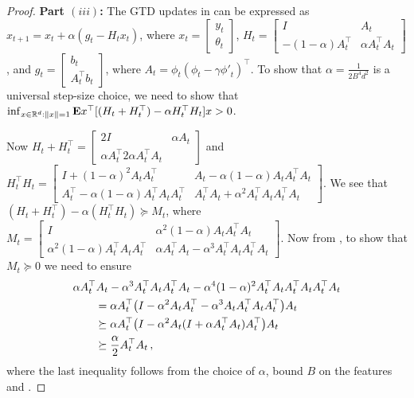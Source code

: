 \begin{proof}
\textbf{Part $(iii)$:}
 The GTD updates in  can be expressed as $x_{t+1}=x_t+\alpha (g_t -H_t x_t)$, where $x_t=\left[\begin{matrix}y_t\\\theta_t\end{matrix}\right]$, $H_t=\left[\begin{matrix}I &A_t \\ -(1-\alpha)A^\top_t & \alpha A_t^\top A_t\end{matrix}\right]$, and $g_t=\left[\begin{matrix} b_t\\ A_t^\top b_t\end{matrix}\right]$, where $A_t=\phi_t(\phi_t-\gamma{\phi'}_t)^\top$. To show that $\alpha=\frac{1}{2B^4 d^2}$ is a universal step-size choice, we need to show that   $\inf_{x\in \mathbb{R}^d:\left\| x\right\|=1}\mathbf{E}{x^\top[(H_t+H_t^\top) -\alpha H_t^\top H_t]x}>0$.

Now $H_t+H_t^\top=\left[\begin{matrix} 2I & \alpha A_t\\ \alpha A_t^\top 2\alpha A_t^\top A_t\end{matrix}\right]$ and $H_t^\top H_t=\left[\begin{matrix} I+(1-\alpha)^2A_tA_t^\top & A_t-\alpha(1-\alpha)A_tA_t^\top A_t\\ A_t^\top-\alpha(1-\alpha)A_t^\top A_t A_t^\top & A_t^\top A_t+\alpha^2A_t^\top A_t A_t^\top A_t\end{matrix}\right]$.  We see that $(H_t+H_t^\top) -\alpha(H_t^\top H_t) \succeq M_t$, 
 where $M_t=\left[\begin{matrix}I &\alpha^2(1-\alpha) A_tA_t^\top A_t\\ \alpha^2(1-\alpha) A_t^\top A_t A_t^\top &\alpha A_t^\top A_t-\alpha^3A_t^\top A_tA_t^\top A_t\end{matrix}\right]$. Now from , to show that $M_t\succeq 0$ we need to ensure 
\begin{align*}
\MoveEqLeft 
\alpha A_t^\top A_t -\alpha^3A_t^\top A_t A_t^\top A_t - \alpha^4(1-\alpha)^2A_t^\top A_t A_t^\top A_t A_t^\top A_t\\
&=\alpha A_t^\top\big(I-\alpha^2 A_tA_t^\top-\alpha^3A_tA_t^\top A_tA_t^\top\big)A_t\\
&\succeq \alpha A_t^\top\big(I-\alpha^2 A_t(I+\alpha A_t^\top A_t)A_t^\top\big)A_t\\
&\succeq \frac{\alpha}{2} A_t^\top A_t\,,
\end{align*}
where the last inequality follows from the choice of $\alpha$, bound $B$ on the features and .
\end{proof}
